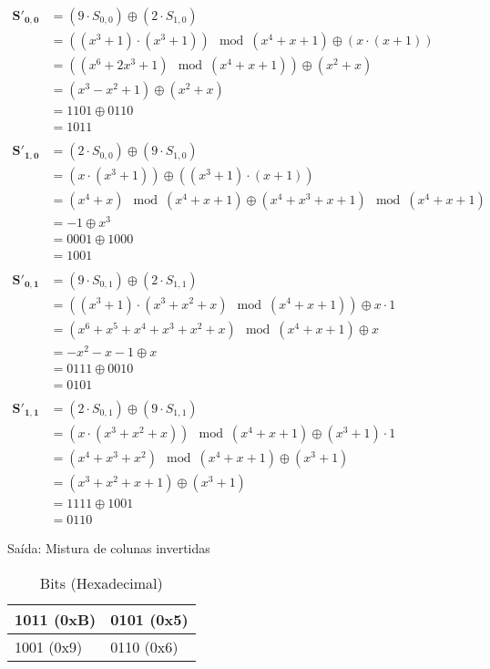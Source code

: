 \documentclass[
    article,            %
    11pt,               %
    oneside,            %
    a4paper,            %
    english,            %
    brazil,             %
    sumario=tradicional,
    ]{abntex2}
\begin{document}
\begin{align*}
\mathbf{S'_{0,0}} &= (9 \cdot S_{0,0}) \oplus (2 \cdot S_{1,0})\\
                  &= ((x^3 + 1) \cdot (x^3 + 1)) \mod (x^4 + x + 1) \oplus (x \cdot (x+1)) \\ 
                  &= ((x^6 + 2x^3 + 1) \mod (x^4 + x + 1)) \oplus (x^2+x) \\
                  &= (x^3 - x^2 + 1) \oplus (x^2+x) \\
                  &= 1101 \oplus 0110 \\
                  &= 1011 \\\\
\mathbf{S'_{1,0}} &= (2 \cdot S_{0,0}) \oplus (9 \cdot S_{1,0})\\
                  &= (x \cdot (x^3 + 1)) \oplus ((x^3 + 1) \cdot (x+1)) \\
                  &= (x^4 + x) \mod (x^4 + x + 1) \oplus (x^4+x^3+x+1) \mod (x^4 + x + 1) \\
                  &= -1 \oplus x^3 \\
                  &= 0001 \oplus 1000 \\
                  &= 1001 \\\\
\mathbf{S'_{0,1}} &= (9 \cdot S_{0,1}) \oplus (2 \cdot S_{1,1})\\
                  &= ((x^3 + 1) \cdot (x^3+x^2+x) \mod (x^4 + x + 1)) \oplus x \cdot 1 \\
                  &= (x^6 + x^5 + x^4 + x^3 + x^2 + x) \mod (x^4 + x + 1) \oplus x \\
                  &= -x^2-x-1 \oplus x \\
                  &= 0111 \oplus 0010 \\
                  &= 0101 \\\\
\mathbf{S'_{1,1}} &= (2 \cdot S_{0,1}) \oplus (9 \cdot S_{1,1})\\
                  &= (x \cdot (x^3+x^2+x)) \mod (x^4+x+1) \oplus (x^3 + 1) \cdot 1 \\
                  &= (x^4+x^3+x^2) \mod (x^4+x+1) \oplus (x^3 + 1) \\
                  &= (x^3+x^2+x+1) \oplus (x^3+1) \\
                  &= 1111 \oplus 1001 \\
                  &= 0110
\end{align*}

\begin{table}[H]
\centering
\caption{Saída: Mistura de colunas invertidas}
\label{tabela-mistura-coluna-invertida}
\begin{tabular}{|l|l|}
\hline
1011 (0xB) & 0101 (0x5) \\ \hline
1001 (0x9) & 0110 (0x6) \\ \hline
\end{tabular}
\caption*{Bits (Hexadecimal)}
\end{table}
\end{document}
